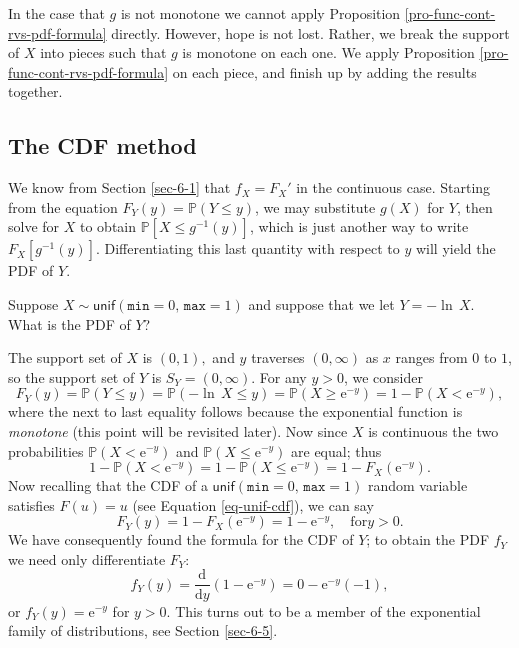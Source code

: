 \begin{rem}
In the case that \(g\) is not monotone we cannot apply Proposition
\ref{pro-func-cont-rvs-pdf-formula} directly. However, hope is not
lost. Rather, we break the support of \(X\) into pieces such that
\(g\) is monotone on each one. We apply Proposition
\ref{pro-func-cont-rvs-pdf-formula} on each piece, and finish up by
adding the results together.
\end{rem}

\subsection{The CDF method}
\label{sec-6-4-2}

We know from Section \ref{sec-6-1} that \(f_{X}=F_{X}'\)
in the continuous case. Starting from the equation
\(F_{Y}(y)=\mathbb{P}(Y\leq y)\), we may substitute \(g(X)\) for
\(Y\), then solve for \(X\) to obtain \(\mathbb{P}[X\leq g^{-1}(y)]\),
which is just another way to write
\(F_{X}[g^{-1}(y)]\). Differentiating this last quantity with respect
to \(y\) will yield the PDF of \(Y\).


Suppose \(X\sim\mathsf{unif}(\mathtt{min}=0,\,\mathtt{max}=1)\) and
suppose that we let \(Y=-\ln\, X\). What is the PDF of \(Y\)?

The support set of \(X\) is \((0,1),\) and \(y\) traverses
\((0,\infty)\) as \(x\) ranges from \(0\) to \(1\), so the support set
of \(Y\) is \(S_{Y}=(0,\infty)\). For any \(y>0\), we consider \[
F_{Y}(y)=\mathbb{P}(Y\leq y)=\mathbb{P}(-\ln\, X\leq
y)=\mathbb{P}(X\geq\mathrm{e}^{-y})=1-\mathbb{P}(X<\mathrm{e}^{-y}),
\] where the next to last equality follows because the exponential
function is \emph{monotone} (this point will be revisited later). Now since
\(X\) is continuous the two probabilities
\(\mathbb{P}(X<\mathrm{e}^{-y})\) and
\(\mathbb{P}(X\leq\mathrm{e}^{-y})\) are equal; thus \[ 1-\mathbb{P}(X
<
\mathrm{e}^{-y})=1-\mathbb{P}(X\leq\mathrm{e}^{-y})=1-F_{X}(\mathrm{e}^{-y}).
\] Now recalling that the CDF of a
\(\mathsf{unif}(\mathtt{min}=0,\,\mathtt{max}=1)\) random variable
satisfies \(F(u)=u\) (see Equation \eqref{eq-unif-cdf}), we can say \[
F_{Y}(y)=1-F_{X}(\mathrm{e}^{-y})=1-\mathrm{e}^{-y},\quad \mbox{for
}y>0.  \] We have consequently found the formula for the CDF of \(Y\);
to obtain the PDF \(f_{Y}\) we need only differentiate \(F_{Y}\): \[
f_{Y}(y)=\frac{\mathrm{d}}{\mathrm{d}
y}\left(1-\mathrm{e}^{-y}\right)=0-\mathrm{e}^{-y}(-1), \] or
\(f_{Y}(y)=\mathrm{e}^{-y}\) for \(y>0\). This turns out to be a
member of the exponential family of distributions, see Section
\ref{sec-6-5}.




